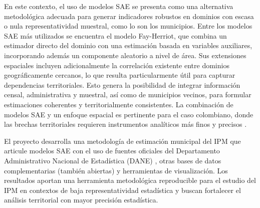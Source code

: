En este contexto, el uso de modelos SAE se presenta como una alternativa metodológica adecuada para generar indicadores robustos en dominios con escasa o nula representatividad muestral, como lo son los municipios. Entre los modelos SAE más utilizados se encuentra el modelo Fay-Herriot, que combina un estimador directo del dominio con una estimación basada en variables auxiliares, incorporando además un componente aleatorio a nivel de área. Sus extensiones espaciales incluyen adicionalmente la correlación existente entre dominios geográficamente cercanos, lo que resulta particularmente útil para capturar dependencias territoriales. Esto genera la posibilidad de integrar información censal, administrativa y muestral, así como de municipios vecinos, para formular estimaciones coherentes y territorialmente consistentes. La combinación de modelos SAE y un enfoque espacial es pertinente para el caso colombiano, donde las brechas territoriales requieren instrumentos analíticos más finos y precisos \cite{MolinaRao_2010, PratesiSalvati_2019, RaoMolina_2015}.



El proyecto desarrolla una metodología de estimación municipal del IPM que articule modelos SAE con el uso de fuentes oficiales del Departamento Administrativo Nacional de Estadística (DANE) \cite{DANE_PobrezaMultidimensional_2023}, otras bases de datos complementarias (también abiertas) %
y herramientas de visualización. Los resultados aportan una herramienta metodológica reproducible para el estudio del IPM en contextos de baja representatividad estadística y buscan fortalecer el análisis territorial con mayor precisión estadística.


